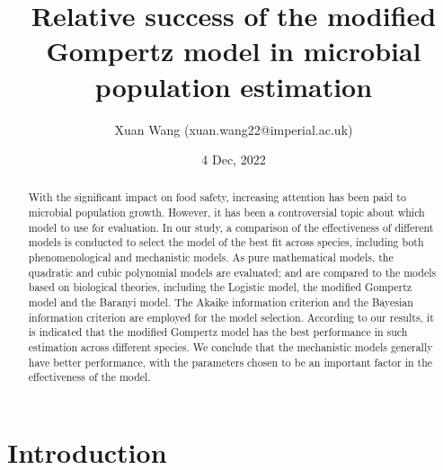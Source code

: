 \documentclass[11pt, oneside]{article}
\title{Relative success of the modified Gompertz model in microbial population estimation}
\author{Xuan Wang (xuan.wang22@imperial.ac.uk)}
\date{4 Dec, 2022}
\begin{document}
\nocite{*}
	\maketitle
	\newpage

	\begin{abstract}
	With the significant impact on food safety, increasing attention has been paid to microbial population growth. However, it has been a controversial topic about which model to use for evaluation. In our study, a comparison of the effectiveness of different models is conducted to select the model of the best fit across species, including both phenomenological and mechanistic models. As pure mathematical models, the quadratic and cubic polynomial models are evaluated; and are compared to the models based on biological theories, including the Logistic model, the modified Gompertz model and the Baranyi model. The Akaike information criterion and the Bayesian information criterion are employed for the model selection. According to our results, it is indicated that the modified Gompertz model has the best performance in such estimation across different species. We conclude that the mechanistic models generally have better performance, with the parameters chosen to be an important factor in the effectiveness of the model.

	\end{abstract}
	\pagebreak

	\section{Introduction}
\end{document}
